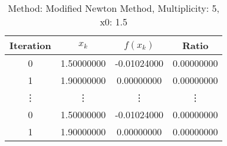 \begin{table}
\centering
\caption{Method: Modified Newton Method, Multiplicity: 5, x0: 1.5}
\label{tab:table_Modified_Newton_Method_5_1_5}
\begin{tabular}{c c c c}
\toprule
Iteration &      $x_k$ &    $f(x_k)$ &      Ratio \\
\midrule
        0 & 1.50000000 & -0.01024000 & 0.00000000 \\
        1 & 1.90000000 &  0.00000000 & 0.00000000 \\
   \vdots &     \vdots &      \vdots &     \vdots \\
        0 & 1.50000000 & -0.01024000 & 0.00000000 \\
        1 & 1.90000000 &  0.00000000 & 0.00000000 \\
\bottomrule
\end{tabular}
\end{table}
